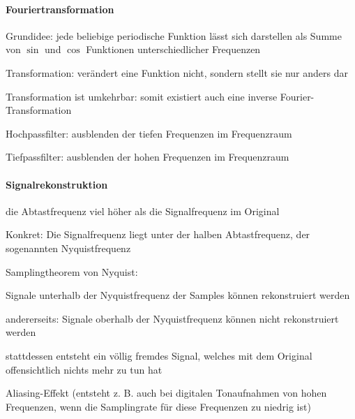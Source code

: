 \documentclass[landscape]{article}
\begin{document}
\begin{multicols}{3}
  
  \paragraph{Fouriertransformation}
  \begin{itemize*}
    \item Grundidee: jede beliebige periodische Funktion lässt sich darstellen als Summe von $\sin$ und $\cos$ Funktionen unterschiedlicher Frequenzen
    \item Transformation: verändert eine Funktion nicht, sondern stellt sie nur anders dar
    \item Transformation ist umkehrbar: somit existiert auch eine inverse Fourier-Transformation
    \item Hochpassfilter: ausblenden der tiefen Frequenzen im Frequenzraum
    \item Tiefpassfilter: ausblenden der hohen Frequenzen im Frequenzraum
  \end{itemize*}
  
  
  \paragraph{Signalrekonstruktion}
  \begin{itemize*}
    \item die Abtastfrequenz viel höher als die Signalfrequenz im Original
    \item Konkret: Die Signalfrequenz liegt unter der halben Abtastfrequenz, der sogenannten Nyquistfrequenz
    \item Samplingtheorem von Nyquist:
          \begin{itemize*}
            \item Signale unterhalb der Nyquistfrequenz der Samples können rekonstruiert werden
            \item andererseits: Signale oberhalb der Nyquistfrequenz können nicht rekonstruiert werden
            \item stattdessen entsteht ein völlig fremdes Signal, welches mit dem Original offensichtlich nichts mehr zu tun hat
            \item Aliasing-Effekt (entsteht z. B. auch bei digitalen Tonaufnahmen von hohen Frequenzen, wenn die Samplingrate für diese Frequenzen zu niedrig ist)
          \end{itemize*}
  \end{itemize*}
  

\end{multicols}
\end{document}

